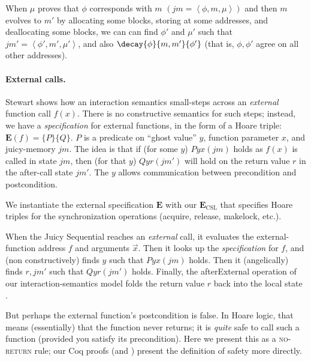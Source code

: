\begin{lemma}
\label{lemma:chap42}
When $\mu$ proves that $\phi$ corresponds with $m$
$(\mathit{jm}=\left<\phi,m,\mu\right>)$
and then $m$ evolves to $m'$ by 
allocating some blocks, storing at some addresses, and deallocating some blocks,
we can can find $\phi'$ and $\mu'$ such that 
$\mathit{jm'}=\left<\phi',m',\mu'\right>$,
and also $\decay{\phi}{m,m'}{\phi'}$ (that is,
$\phi,\phi'$ agree on all other addresses).
\end{lemma}


\paragraph{External calls.}
Stewart \cite[page 119]{stewart15:phd} shows how an interaction
semantics small-steps across an \emph{external} function
call $f(x)$.  There is no constructive semantics for such steps;
instead, we have a \emph{specification} for external functions,
in the form of a Hoare triple: $\mathbf{E}(f)=
\{P\}\{Q\}$.
$P$ is a predicate on ``ghost value'' $y$, function parameter $x$,
and juicy-memory $\mathit{jm}$.
The idea is that if (for some $y$) $Pyx(\mathit{jm})$ holds
as $f(x)$ is called in state $\mathit{jm}$, then (for that $y$) $Qyr
(\mathit{jm}')$ will hold on the return value $r$ in the after-call state
$\mathit{jm}'$.  The $y$ allows communication between
precondition and postcondition.

We instantiate the external specification $\mathbf{E}$ with our
$\mathbf{E}_\mathrm{CSL}$ that specifies 
Hoare triples for 
the synchronization operations
(acquire, release, makelock, etc.).

When the Juicy Sequential reaches an \emph{external} call, it
evaluates
the external-function address $f$ and arguments $\vec{x}$.  Then it
looks up the \emph{specification} for $f$, and (non constructively)
finds $y$ such that $Pyx (\mathit{jm})$ holds.  Then it
(angelically) finds $r, \mathit{jm}'$ such that
$Qyr (\mathit{jm}')$
holds.  Finally,
the afterExternal operation of our interaction-semantics model
folds the return value $r$ back into the local state \cite{bsda:esop2014}.

But perhaps the external function's postcondition
is false.  In Hoare logic, that means (essentially) that the function
never returns; it is \emph{quite} safe to call such a function
(provided you satisfy its precondition).
Here we present this as a \textsc{no-return} rule;
our Coq proofs (and \cite[pages 119--120]{stewart15:phd})
present the definition of safety more directly.

